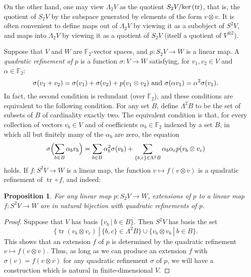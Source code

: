 \documentclass[11pt]{amsart}
\theoremstyle{plain}
\newtheorem{prop}[thm]{Proposition}
\theoremstyle{definition}
\renewcommand{\ker}{\textup{ker}\,}
\DeclareMathOperator{\trace}{tr}
\renewcommand{\to}{\longrightarrow}
\theoremstyle{plain}
\newcommand{\F}{\mathbb{F}}
\begin{document}
\begin{Conventions and notation}
On the other hand, one may view $\Lambda_2V$ as the quotient $S_2V/\ker(\trace)$, that is, the quotient of $S_2V$ by the subspace generated by elements of the form $v\otimes v$. It is often convenient to define maps out of $\Lambda_2V$ by viewing it as a subobject of $S^2V$, and maps into $\Lambda_2V$ by viewing it as a quotient of $S_2V$ (itself a quotient of $V^{\otimes2}$).

Suppose that $V$ and $W$ are $\F_2$-vector spaces, and $p:S_2V\to W$ is a linear map. A \emph{quadratic refinement of $p$} is a function $\sigma:V\to W$ satisfying, for $v_1,v_2\in V$ and $\alpha\in\F_2$:
\[\sigma(v_1+v_2)=\sigma(v_1)+\sigma(v_2)+p(v_1\otimes v_2)\textup{ and }\sigma(\alpha v_1)=\alpha^2\sigma(v_1).\]
In fact, the second condition is redundant (over $\F_2$), and these conditions are equivalent to the following condition. For any set $B$, define $\Lambda^2B$ to be the set of subsets of $B$ of cardinality exactly two. 
The equivalent condition is that, for every collection of vectors $v_b\in V$ and of coefficients $\alpha_b\in \F_2$ indexed by a set $B$, in which all but finitely many of the $\alpha_b$ are zero, the equation
\[\sigma\Bigl(\sum_{b\in B}\alpha_bv_b\Bigr)=\sum_{b\in B}\alpha_b^2\sigma(v_b)+\sum_{\{b,c\}\in \Lambda^2B}\alpha_b\alpha_cp(v_b\otimes v_c)\]
holds.
%
%
%
%
%
If $f:S^2V\to W$ is a linear map, the function
$v\mapsto f(v\otimes v)$
is a quadratic refinement of $\trace\circ f$, and indeed:
\begin{prop}\label{propOnExtendingToInvariants}
For any linear map $p:S_2V\to W$, extensions of $p$ to a linear map $f:S^2V\to W$ are in natural bijection  with quadratic refinements of $p$.
\end{prop}
\begin{proof}
Suppose that $V$ has basis $\{v_b\ |\ b\in B\}$. Then $S^2V$ has basis the set 
\[\{\trace(v_b\otimes v_c)\ |\ \{b,c\}\in\Lambda^2B\}\cup\{v_b\otimes v_b\ |\ b\in B\}.\]
This shows that an extension $f$ of $p$ is determined by the quadratic refinement $v\mapsto f(v\otimes v)$. Thus, as long as we can produce an extension $f$ with $\sigma(v)=f(v\otimes v)$ for any quadratic refinement $\sigma$ of $p$, we will have a construction which is natural in finite-dimensional $V$.


\end{proof}
\end{Conventions and notation}
\end{document}
